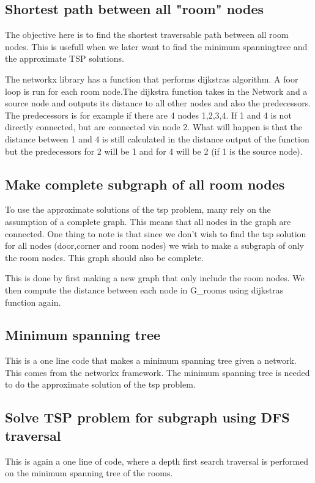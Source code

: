 \subsection{Shortest path between all "room" nodes}
The objective here is to find the shortest traversable path between all room nodes. This is usefull when we later want to find the minimum spanningtree and the approximate TSP solutions.

The networkx library has a function that performs dijkstras algorithm. A foor loop is run for each room node.The dijkstra function takes in the Network and a source node and outputs its distance to all other nodes and also the predecessors. The predecessors is for example if there are 4 nodes 1,2,3,4. If 1 and 4 is not directly connected, but are connected via node 2. What will happen is that the distance between 1 and 4 is still calculated in the distance output of the function but the predecessors for 2 will be 1 and for 4 will be 2 (if 1 is the source node).


\subsection{Make complete subgraph of all room nodes}
To use the approximate solutions of the tsp problem, many rely on the assumption of a complete graph. This means that all nodes in the graph are connected. One thing to note is that since we don't wish to find the tsp solution for all nodes (door,corner and room nodes) we wish to make a subgraph of only the room nodes. This graph should also be complete. 

This is done by first making a new graph that only include the room nodes.
We then compute the distance between each node in G_rooms using dijkstras function again.



\subsection{Minimum spanning tree}
This is a one line code that makes a minimum spanning tree given a network. This comes from the networkx framework. 
The minimum spanning tree is needed to do the approximate solution of the tsp problem.


\subsection{Solve TSP problem for subgraph using DFS traversal}
This is again a one line of code, where a depth first search traversal is performed on the minimum spanning tree of the rooms. 

